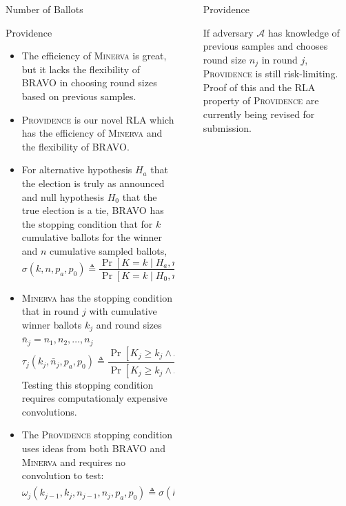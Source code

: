 \documentclass[final]{beamer}
\newcommand{\Minerva}{\textsc{Minerva}\xspace}
\newcommand{\Prov}{\textsc{Providence}\xspace}
\newcommand{\BRAVO}{\textsc{BRAVO}\xspace}
\newlength{\sepwidth}
\newlength{\colwidth}
\newcommand{\separatorcolumn}{\begin{column}{\sepwidth}\end{column}}
\begin{document}
\begin{frame}[t]
\begin{columns}[t]
\begin{column}{\colwidth}
\begin{block}{Number of Ballots}
\end{block}

\begin{block}{Providence}

\begin{itemize}
\item
The efficiency of \Minerva is great, but it lacks the flexibility of \BRAVO in choosing round sizes based on previous samples.
\item
\Prov is our novel RLA which has the efficiency of \Minerva and the flexibility of \BRAVO.
\item For alternative hypothesis $H_a$ that the election is truly as announced and null
hypothesis $H_0$ that the true election is a tie, \BRAVO has the stopping condition that
for $k$ cumulative ballots for the winner and $n$ cumulative sampled ballots,
$$\sigma(k,n,p_a,p_0) \triangleq \frac{\Pr[K=k\mid H_a, n]}{\Pr[K=k\mid H_0, n]}\ge \frac{1}{\alpha}.$$
\item \Minerva has the stopping condition that in round $j$ with cumulative winner ballots $k_j$ and round sizes $\bar n_j = n_1,n_2,\ldots,n_j$
$$\tau_j(k_j,\bar n_j,p_a,p_0) \triangleq \frac{\Pr[K_j\ge k_j \wedge \mathcal{A}_{i<j}(X)\neq Correct \mid H_a, \bar n_j]}{\Pr[K_j\ge k_j \wedge \mathcal{A}_{i<j}(X)\neq Correct \mid H_0, \bar n_j]}\ge \frac{1}{\alpha}.$$ Testing this stopping condition requires computationaly expensive convolutions.
\item The \Prov stopping condition uses ideas from both \BRAVO and \Minerva and requires no convolution to test:
$$\omega_j(k_{j-1},k_j,n_{j-1},n_j,p_a,p_0)\triangleq \sigma(k_{j-1},n_{j-1},p_a,p_0)\cdot \tau_1(k_j,n_j,p_a,p_0) \ge \frac{1}{\alpha}.$$ 
\end{itemize}

\end{block}

\end{column}

\separatorcolumn

\begin{column}{\colwidth}

\begin{block}{Providence}

If adversary $\mathcal{A}$ has knowledge of previous samples and chooses round size $n_j$ in round $j$, 
\Prov is still risk-limiting. Proof of this and the RLA property of \Prov are currently being revised for submission.


\end{block}
\end{column}
\end{columns}
\end{frame}
\end{document}
